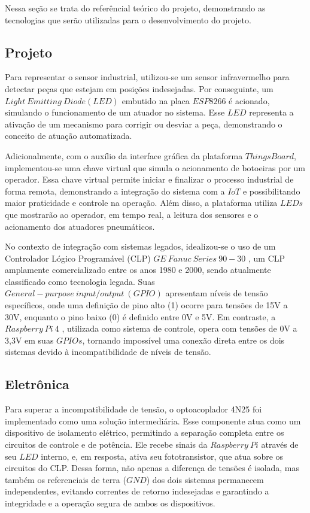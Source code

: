 \documentclass{ecatfg}
\begin{document}
Nessa seção se trata do referêncial teórico do projeto, demonstrando as tecnologias que serão utilizadas para o desenvolvimento do projeto.\par

\subsection{Projeto}
\label{SeçãoIII1}

Para representar o sensor industrial, utilizou-se um sensor infravermelho \cite{sensor_ir} para detectar peças que estejam em posições indesejadas. Por conseguinte, um $Light\ Emitting\ Diode(LED)$ \cite{led} embutido na placa $ESP8266$ \cite{esp8266} é acionado, simulando o funcionamento de um atuador no sistema. Esse $LED$ representa a ativação de um mecanismo para corrigir ou desviar a peça, demonstrando o conceito de atuação automatizada.\par

Adicionalmente, com o auxílio da interface gráfica da plataforma $ThingsBoard$, implementou-se uma chave virtual que simula o acionamento de botoeiras por um operador. Essa chave virtual permite iniciar e finalizar o processo industrial de forma remota, demonstrando a integração do sistema com a $IoT$ e possibilitando maior praticidade e controle na operação. Além disso, a plataforma utiliza $LEDs$ que mostrarão ao operador, em tempo real, a leitura dos sensores e o acionamento dos atuadores pneumáticos.\par

No contexto de integração com sistemas legados, idealizou-se o uso de um Controlador Lógico Programável (CLP) $GE\ Fanuc\ Series\ 90-30$ \cite{gefanuc}, um CLP amplamente comercializado entre os anos 1980 e 2000, sendo atualmente classificado como tecnologia legada. Suas $General-purpose\ input/output\ (GPIO)$ \cite{gpio} apresentam níveis de tensão específicos, onde uma definição de pino alto (1) ocorre para tensões de 15V a 30V, enquanto o pino baixo (0) é definido entre 0V e 5V. Em contraste, a $Raspberry\ Pi\ 4$ \cite{Raspberry_pi_4}, utilizada como sistema de controle, opera com tensões de 0V a 3,3V em suas $GPIOs$, tornando impossível uma conexão direta entre os dois sistemas devido à incompatibilidade de níveis de tensão. \par

\subsection{Eletrônica}
\label{SeçãoIII2}
Para superar a incompatibilidade de tensão, o optoacoplador 4N25\cite{4n25} foi implementado como uma solução intermediária. Esse componente atua como um dispositivo de isolamento elétrico, permitindo a separação completa entre os circuitos de controle e de potência. Ele recebe sinais da $Raspberry\ Pi$ através de seu $LED$ interno, e, em resposta, ativa seu fototransistor, que atua sobre os circuitos do CLP. Dessa forma, não apenas a diferença de tensões é isolada, mas também os referenciais de terra ($GND$) dos dois sistemas permanecem independentes, evitando correntes de retorno indesejadas e garantindo a integridade e a operação segura de ambos os dispositivos.\par
\end{document}
